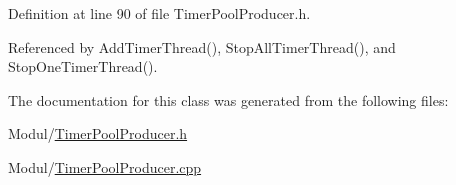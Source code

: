 \-Definition at line 90 of file \-Timer\-Pool\-Producer.\-h.



\-Referenced by \-Add\-Timer\-Thread(), \-Stop\-All\-Timer\-Thread(), and \-Stop\-One\-Timer\-Thread().



\-The documentation for this class was generated from the following files\-:\begin{DoxyCompactItemize}
\item 
\-Modul/\hyperlink{TimerPoolProducer_8h}{\-Timer\-Pool\-Producer.\-h}\item 
\-Modul/\hyperlink{TimerPoolProducer_8cpp}{\-Timer\-Pool\-Producer.\-cpp}\end{DoxyCompactItemize}
